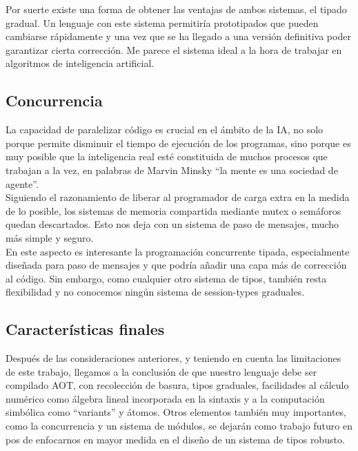 Por suerte existe una forma de obtener las ventajas de ambos sistemas, el tipado gradual. Un lenguaje con este sistema permitiría prototipados que pueden cambiarse rápidamente y una vez que se ha llegado a una versión definitiva poder garantizar cierta corrección. Me parece el sistema ideal a la hora de trabajar en algoritmos de inteligencia artificial.\\


\subsection{Concurrencia}
La capacidad de paralelizar código es crucial en el ámbito de la IA, no solo porque permite disminuir el tiempo de ejecución de los programas, sino porque es muy posible que la inteligencia real esté constituida de muchos procesos que trabajan a la vez, en palabras de Marvin Minsky ``la mente es una sociedad de agente''.\\

Siguiendo el razonamiento de liberar al programador de carga extra en la medida de lo posible, los sistemas de memoria compartida mediante mutex o semáforos quedan descartados. Esto nos deja con un sistema de paso de mensajes, mucho más simple y seguro.\\

En este aspecto es interesante la programación concurrente tipada, especialmente diseñada para paso de mensajes y que podría añadir una capa más de corrección al código. Sin embargo, como cualquier otro sistema de tipos, también resta flexibilidad y no conocemos ningún sistema de session-types graduales.\\


\subsection{Características finales}

Después de las consideraciones anteriores, y teniendo en cuenta las limitaciones de este trabajo, llegamos a la conclusión de que nuestro lenguaje debe ser compilado AOT, con recolección de basura, tipos graduales, facilidades al cálculo numérico como álgebra lineal incorporada en la sintaxis y a la computación simbólica como ``variants'' y átomos. Otros elementos también muy importantes, como la concurrencia y un sistema de módulos, se dejarán como trabajo futuro en pos de enfocarnos en mayor medida en el diseño de un sistema de tipos robusto.\\

